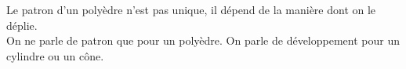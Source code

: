 \begin{changemargin}{-10mm}{-10mm}
    \begin{remarque}    
        Le patron d'un polyèdre n'est pas unique, il dépend de la manière dont on le déplie. \\
        On ne parle de patron que pour un polyèdre. On parle de développement pour un cylindre ou un cône.
    \end{remarque}    
\end{changemargin}
 
